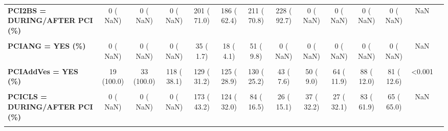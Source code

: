 \documentclass[
]{article}
\begin{document}
\begin{table}[H]
\begin{tabular}[t]{>{\raggedright\arraybackslash}p{5em}ccccccccccccc}
\textbf{PCI2BS = DURING/AFTER PCI (\%)} & 0 (  NaN) & 0 (  NaN) & 0 (  NaN) & 201 ( 71.0) & 186 ( 62.4) & 211 ( 70.8) & 228 ( 92.7) & 0 (  NaN) & 0 (  NaN) & 0 (  NaN) & 0 (  NaN) & NaN & \\
\textbf{\cellcolor{gray!10}{PCIALL = YES (\%)}} & \cellcolor{gray!10}{0 (  NaN)} & \cellcolor{gray!10}{0 (  NaN)} & \cellcolor{gray!10}{1192 ( 75.2)} & \cellcolor{gray!10}{1326 ( 63.9)} & \cellcolor{gray!10}{1210 ( 69.3)} & \cellcolor{gray!10}{1279 ( 71.9)} & \cellcolor{gray!10}{1307 ( 69.3)} & \cellcolor{gray!10}{1297 ( 72.4)} & \cellcolor{gray!10}{1133 ( 63.7)} & \cellcolor{gray!10}{1382 ( 79.0)} & \cellcolor{gray!10}{1363 ( 77.7)} & \cellcolor{gray!10}{NaN} & \cellcolor{gray!10}{}\\
\textbf{PCIANG = YES (\%)} & 0 (  NaN) & 0 (  NaN) & 0 (  NaN) & 35 (  1.7) & 18 (  4.1) & 51 (  9.8) & 0 (  NaN) & 0 (  NaN) & 0 (  NaN) & 0 (  NaN) & 0 (  NaN) & NaN & \\
\textbf{\cellcolor{gray!10}{PCIANT = YES (\%)}} & \cellcolor{gray!10}{73 ( 97.3)} & \cellcolor{gray!10}{208 ( 75.4)} & \cellcolor{gray!10}{300 ( 58.6)} & \cellcolor{gray!10}{293 ( 14.1)} & \cellcolor{gray!10}{299 ( 67.6)} & \cellcolor{gray!10}{298 ( 57.4)} & \cellcolor{gray!10}{246 ( 40.9)} & \cellcolor{gray!10}{211 ( 35.2)} & \cellcolor{gray!10}{143 ( 25.7)} & \cellcolor{gray!10}{144 ( 21.6)} & \cellcolor{gray!10}{162 ( 25.8)} & \cellcolor{gray!10}{<0.001} & \cellcolor{gray!10}{}\\
\textbf{PCIAddVes = YES (\%)} & 19 (100.0) & 33 (100.0) & 118 ( 38.1) & 129 ( 31.2) & 125 ( 28.9) & 130 ( 25.2) & 43 (  7.6) & 50 (  9.0) & 64 ( 11.9) & 88 ( 12.0) & 81 ( 12.6) & <0.001 & \\
\textbf{\cellcolor{gray!10}{PCICL = YES (\%)}} & \cellcolor{gray!10}{0 (  NaN)} & \cellcolor{gray!10}{231 ( 83.7)} & \cellcolor{gray!10}{462 ( 90.2)} & \cellcolor{gray!10}{414 ( 20.0)} & \cellcolor{gray!10}{392 ( 88.7)} & \cellcolor{gray!10}{509 ( 98.1)} & \cellcolor{gray!10}{164 ( 27.2)} & \cellcolor{gray!10}{112 ( 18.7)} & \cellcolor{gray!10}{82 ( 14.8)} & \cellcolor{gray!10}{137 ( 18.7)} & \cellcolor{gray!10}{100 ( 15.5)} & \cellcolor{gray!10}{NaN} & \cellcolor{gray!10}{}\\
\textbf{PCICLS = DURING/AFTER PCI (\%)} & 0 (  NaN) & 0 (  NaN) & 0 (  NaN) & 173 ( 43.2) & 124 ( 32.0) & 84 ( 16.5) & 26 ( 15.1) & 37 ( 32.2) & 27 ( 32.1) & 83 ( 61.9) & 65 ( 65.0) & NaN & \\
\textbf{\cellcolor{gray!10}{PCISTE = YES (\%)}} & \cellcolor{gray!10}{77 ( 98.7)} & \cellcolor{gray!10}{202 ( 73.2)} & \cellcolor{gray!10}{420 ( 99.5)} & \cellcolor{gray!10}{403 ( 19.4)} & \cellcolor{gray!10}{388 ( 87.8)} & \cellcolor{gray!10}{471 ( 90.8)} & \cellcolor{gray!10}{527 ( 87.4)} & \cellcolor{gray!10}{528 ( 89.6)} & \cellcolor{gray!10}{515 ( 91.8)} & \cellcolor{gray!10}{661 ( 89.3)} & \cellcolor{gray!10}{566 ( 87.9)} & \cellcolor{gray!10}{<0.001} & \cellcolor{gray!10}{}\\

\end{tabular}
\end{table}
\end{document}
